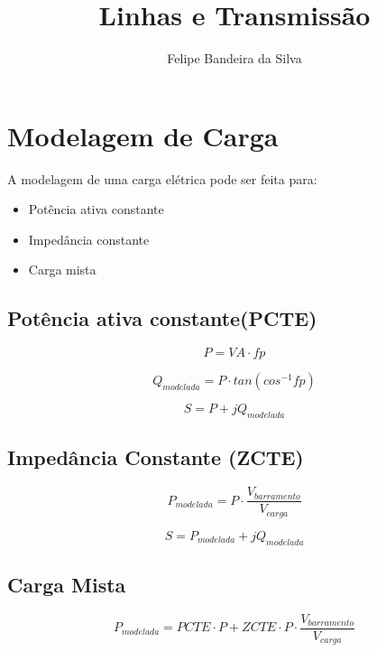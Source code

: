 \documentclass[a4paper, 10pt, twocolumn]{article}
\title{Linhas e Transmissão}
\author{Felipe Bandeira da Silva}
\date{} %
\begin{document}
\maketitle
\section{Modelagem de Carga}

A modelagem de uma carga elétrica pode ser feita para:

\begin{itemize}
\item Potência ativa constante
\item Impedância constante
\item Carga mista
\end{itemize}

\subsection{Potência ativa constante(PCTE)}
    
\begin{equation}
P = VA \cdot fp
\end{equation}

\begin{equation}   
Q_{modelada} = P \cdot tan(cos^{-1}fp)
\end{equation}

\begin{equation}
S = P+jQ_{modelada}
\end{equation}

\subsection{Impedância Constante (ZCTE)}

\begin{equation}
P_{modelada} = P \cdot \frac{V_{barramento}}{V_{carga}}
\end{equation}

\begin{equation}   
S = P_{modelada} + jQ_{modelada}  
\end{equation}

\subsection{Carga Mista}

\begin{equation}
P_{modelada} =PCTE \cdot P +  ZCTE \cdot  P \cdot \frac{V_{barramento}}{V_{carga}}
\end{equation}
\end{document}
